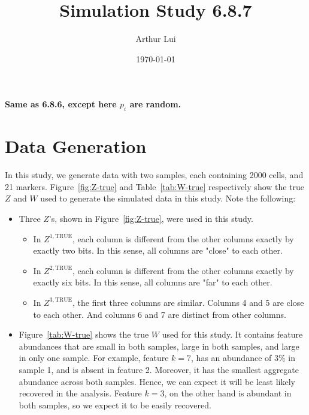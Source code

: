 \documentclass[10pt]{article} %
\title{Simulation Study 6.8.7}
\author{Arthur Lui}
\date{\today} %
\def\true{\text{TRUE}}
\begin{document}
\maketitle



\textbf{Same as 6.8.6, except here $p_i$ are random.}

\section{Data Generation}\label{sec:data-generation}
In this study, we generate data with two samples, each containing 2000 cells,
and 21 markers. Figure~\ref{fig:Z-true} and Table~\ref{tab:W-true}
respectively show the true $Z$ and $W$ used to generate the simulated data in
this study. Note the following:
\begin{itemize}
  \item Three $Z$'s, shown in Figure~\ref{fig:Z-true}, were used in this study.
  \begin{itemize}
    \item In $Z^{1,\true}$, each column is different from the other columns exactly
    by exactly two bits. In this sense, all columns are "close" to each
    other.
    \item In $Z^{2,\true}$, each column is different from the other columns exactly
    by exactly six bits. In this sense, all columns are "far" to each
    other.
    \item In $Z^{3,\true}$, the first three columns are similar. Columns 4 and 5 are 
    close to each other. And columns 6 and 7 are distinct from other columns. 
  \end{itemize}
  \item Figure~\ref{tab:W-true} shows the true $W$ used for this study. It
    contains feature abundances that are small in both samples, large in both
    samples, and large in only one sample. For example, feature $k=7$, 
    has an abundance of $3\%$ in sample 1, and is absent in feature 2. 
    Moreover, it has the smallest aggregate abundance across both samples. 
    Hence, we can expect it will be least likely recovered in the analysis. 
    Feature $k=3$, on the other hand is abundant in both samples, so we expect
    it to be easily recovered.
\end{itemize}
\end{document}
